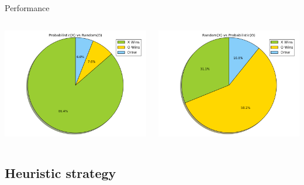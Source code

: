 \documentclass{beamer}
\begin{document}
\begin{frame}{Performance}
	 \begin{columns}
	 	\begin{column}{0.5\textwidth}
	 		\centering
	 		\includegraphics[scale =0.30]{probVSrandom.png}
	 	\end{column}
	 	\begin{column}{0.5\textwidth}
	 		\centering
	 		\includegraphics[scale =0.30]{randVSprob.png}
	 	\end{column}
	 \end{columns}
	
\end{frame}

\subsection{Heuristic strategy}
\end{document}
